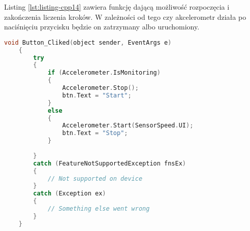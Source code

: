 Listing \ref{lst:listing-cpp14} zawiera funkcję dającą możliwość rozpoczęcia i zakończenia liczenia kroków. W zależności od tego czy akcelerometr działa po naciśnięciu przycisku będzie on zatrzymany albo uruchomiony.
\begin{lstlisting}[caption=Rozpoczęcia i zakończenie liczenia kroków, label={lst:listing-cpp14}, language=C++]
	void Button_Cliked(object sender, EventArgs e) 
	{
		try
		{
			if (Accelerometer.IsMonitoring)
			{
				Accelerometer.Stop();
				btn.Text = "Start";
			}   
			else
			{
				Accelerometer.Start(SensorSpeed.UI);
				btn.Text = "Stop";
			}
			
		}
		catch (FeatureNotSupportedException fnsEx)
		{
			// Not supported on device
		}
		catch (Exception ex)
		{
			// Something else went wrong
		}
	}
\end{lstlisting}